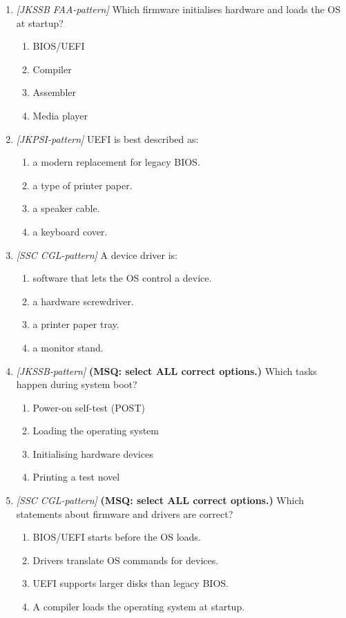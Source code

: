 \documentclass[11pt]{article}
\begin{document}
\begin{enumerate}[label=\textbf{Q\arabic*.}, leftmargin=*]
\item \textit{[JKSSB FAA-pattern]} Which firmware initialises hardware and loads the OS at startup?
  \begin{enumerate}[label=\Alph*.]
    \item BIOS/UEFI
    \item Compiler
    \item Assembler
    \item Media player
  \end{enumerate}
\item \textit{[JKPSI-pattern]} UEFI is best described as:
  \begin{enumerate}[label=\Alph*.]
    \item a modern replacement for legacy BIOS.
    \item a type of printer paper.
    \item a speaker cable.
    \item a keyboard cover.
  \end{enumerate}
\item \textit{[SSC CGL-pattern]} A device driver is:
  \begin{enumerate}[label=\Alph*.]
    \item software that lets the OS control a device.
    \item a hardware screwdriver.
    \item a printer paper tray.
    \item a monitor stand.
  \end{enumerate}
\item \textit{[JKSSB-pattern]} \textbf{(MSQ: select ALL correct options.)} Which tasks happen during system boot?
  \begin{enumerate}[label=\Alph*.]
    \item Power-on self-test (POST)
    \item Loading the operating system
    \item Initialising hardware devices
    \item Printing a test novel
  \end{enumerate}
\item \textit{[SSC CGL-pattern]} \textbf{(MSQ: select ALL correct options.)} Which statements about firmware and drivers are correct?
  \begin{enumerate}[label=\Alph*.]
    \item BIOS/UEFI starts before the OS loads.
    \item Drivers translate OS commands for devices.
    \item UEFI supports larger disks than legacy BIOS.
    \item A compiler loads the operating system at startup.
  \end{enumerate}
\end{enumerate}
\def\JKSSBLessonID{46}\def\JKSSBAnswers{0}
\end{document}
